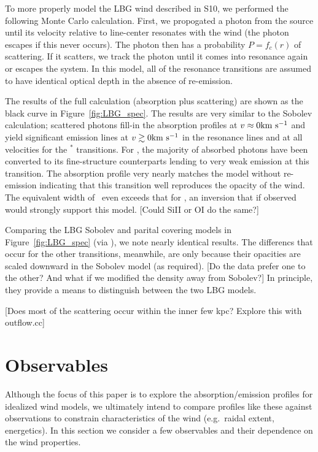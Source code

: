 \documentclass[12pt,preprint]{aastex}
\begin{document}
To more properly model the LBG wind described in S10, we 
performed the following Monte Carlo calculation.  First, we propogated
a photon from the source until its velocity relative to line-center
resonates with the wind (the photon escapes if this never occurs).
The photon then has a probability $P = f_c(r)$ of scattering.  If it
scatters, we track the photon until it comes into
resonance again or escapes the system.  In this model, all of the
resonance transitions are assumed to have identical optical depth in
the absence of re-emission. 

The results of the full calculation (absorption plus scattering) are
shown as the black curve in Figure~\ref{fig:LBG_spec}.  The results
are very similar to the Sobolev calculation; scattered photons fill-in
the absorption profiles at $v \approx 0 {\rm km~s^{-1}}$ and yield significant
emission lines at $v \gtrsim 0 {\rm km~s^{-1}}$ in the resonance lines and at
all velocities for the $^*$ transitions.  For \feiia,
the majority of absorbed photons have been converted to its
fine-structure counterparts lending to very weak emission at this
transition. The absorption profile very nearly matches the
model without re-emission indicating that this transition well
reproduces the opacity of the wind.  
The equivalent width of \feiia\ even exceeds that for \feiib, an
inversion that if observed would strongly support this model.
[Could SiII or OI do the same?]

Comparing the LBG Sobolev and parital covering models in
Figure~\ref{fig:LBG_spec} (via \mgiia), we note nearly identical
results.  The differencs that occur for the other transitions,
meanwhile, are only because their opacities are scaled downward in the
Sobolev model (as required).  [Do the data prefer one to the other?
And what if we modified the density away from Sobolev?]
In principle, they provide a means to distinguish between the two LBG
models.  

[Does most of the scattering occur within the inner few kpc? Explore
this with outflow.cc]


\section{Observables}

Although the focus of this paper is to explore the absorption/emission
profiles for idealized wind models, we ultimately intend to compare 
profiles like these against observations to constrain characteristics
of the wind (e.g.\ raidal extent, energetics).  In this section we
consider a few observables and their dependence on the wind properties.
\end{document}
